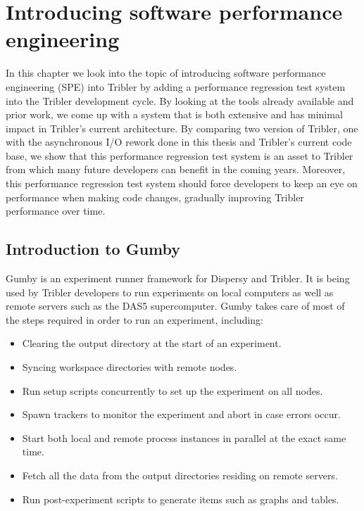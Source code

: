 \chapter{Introducing software performance engineering}
\label{cpt:software_performance_engineering}

In this chapter we look into the topic of introducing software performance engineering (SPE) into Tribler by adding a performance regression test system into the Tribler development cycle.
By looking at the tools already available and prior work, we come up with a system that is both extensive and has minimal impact in Tribler's current architecture.
By comparing two version of Tribler, one with the asynchronous I/O rework done in this thesis and Tribler's current code base, we show that this performance regression test system is an asset to Tribler from which many future developers can benefit in the coming years.
Moreover, this performance regression test system should force developers to keep an eye on performance when making code changes, gradually improving Tribler performance over time.

\section{Introduction to Gumby}
\label{sct:gumby_introduction}

Gumby is an experiment runner framework for Dispersy and Tribler.
It is being used by Tribler developers to run experiments on local computers as well as remote servers such as the DAS5 supercomputer.
Gumby takes care of most of the steps required in order to run an experiment, including:

\begin{itemize}
	\item Clearing the output directory at the start of an experiment.
	\item Syncing workspace directories with remote nodes.
	\item Run setup scripts concurrently to set up the experiment on all nodes.
	\item Spawn trackers to monitor the experiment and abort in case errors occur.
	\item Start both local and remote process instances in parallel at the exact same time.
	\item Fetch all the data from the output directories residing on remote servers.
	\item Run post-experiment scripts to generate items such as graphs and tables.
\end{itemize}

